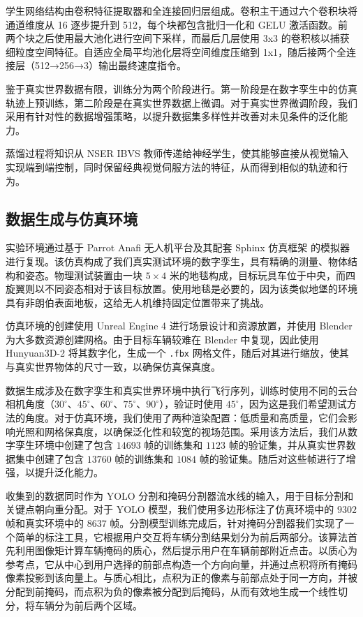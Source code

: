 \documentclass[10pt,twocolumn,letterpaper]{article}
\begin{document}
学生网络结构由卷积特征提取器和全连接回归层组成。卷积主干通过六个卷积块将通道维度从 16 逐步提升到 512，每个块都包含批归一化和 GELU 激活函数。前两个块之后使用最大池化进行空间下采样，而最后几层使用 3x3 的卷积核以捕获细粒度空间特征。自适应全局平均池化层将空间维度压缩到 1x1，随后接两个全连接层（512→256→3）输出最终速度指令。

鉴于真实世界数据有限，训练分为两个阶段进行。第一阶段是在数字孪生中的仿真轨迹上预训练，第二阶段是在真实世界数据上微调。对于真实世界微调阶段，我们采用有针对性的数据增强策略，以提升数据集多样性并改善对未见条件的泛化能力。

蒸馏过程将知识从 NSER IBVS 教师传递给神经学生，使其能够直接从视觉输入实现端到端控制，同时保留经典视觉伺服方法的特征，从而得到相似的轨迹和行为。


\subsection{数据生成与仿真环境}
\label{sec:dataset_sim}

实验环境通过基于 Parrot Anafi 无人机平台及其配套 Sphinx 仿真框架 \cite{WhatisPa31:online} 的模拟器进行复现。该仿真构成了我们真实测试环境的数字孪生，具有精确的测量、物体结构和姿态。物理测试装置由一块 $5\times4$ 米的地毯构成，目标玩具车位于中央，而四旋翼则以不同姿态相对于该目标放置。使用地毯是必要的，因为该类似地堡的环境具有非朗伯表面地板，这给无人机维持固定位置带来了挑战。 

仿真环境的创建使用 Unreal Engine 4 进行场景设计和资源放置，并使用 Blender \cite{blender2024} 为大多数资源创建网格。由于目标车辆较难在 Blender 中复现，因此使用 Hunyuan3D-2 \cite{zhao2025hunyuan3d20scalingdiffusion} 将其数字化，生成一个 \texttt{.fbx} 网格文件，随后对其进行缩放，使其与真实世界物体的尺寸一致，以确保仿真保真度。

数据生成涉及在数字孪生和真实世界环境中执行飞行序列，训练时使用不同的云台相机角度（$30^\circ$、$45^\circ$、$60^\circ$、$75^\circ$、$90^\circ$），验证时使用 $45^\circ$，因为这是我们希望测试方法的角度。对于仿真环境，我们使用了两种渲染配置：低质量和高质量，它们会影响光照和网格保真度，以确保泛化性和较宽的视场范围。采用该方法后，我们从数字孪生环境中创建了包含 $14693$ 帧的训练集和 $1123$ 帧的验证集，并从真实世界数据集中创建了包含 $13760$ 帧的训练集和 $1084$ 帧的验证集。随后对这些帧进行了增强，以提升泛化能力。

收集到的数据同时作为 YOLO 分割和掩码分割器流水线的输入，用于目标分割和关键点朝向重分配。对于 YOLO 模型，我们使用多边形标注了仿真环境中的 $9302$ 帧和真实环境中的 $8637$ 帧。分割模型训练完成后，针对掩码分割器我们实现了一个简单的标注工具，它根据用户交互将车辆分割结果划分为前后两部分。该算法首先利用图像矩计算车辆掩码的质心，然后提示用户在车辆前部附近点击。以质心为参考点，它从中心到用户选择的前部点构造一个方向向量，并通过点积将所有掩码像素投影到该向量上。与质心相比，点积为正的像素与前部点处于同一方向，并被分配到前掩码，而点积为负的像素被分配到后掩码，从而有效地生成一个线性切分，将车辆分为前后两个区域。
\end{document}
